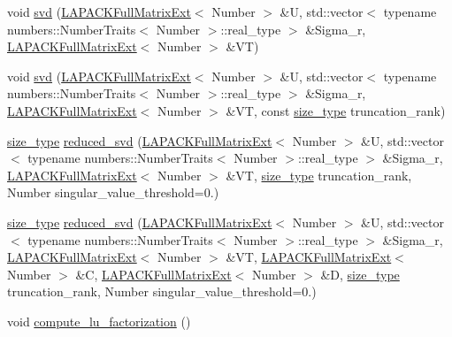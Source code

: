 \begin{DoxyCompactItemize}
\item 
void \hyperlink{classLAPACKFullMatrixExt_a5be14a4d7f9c615f940e870b85d09ecd}{svd} (\hyperlink{classLAPACKFullMatrixExt}{L\+A\+P\+A\+C\+K\+Full\+Matrix\+Ext}$<$ Number $>$ \&U, std\+::vector$<$ typename numbers\+::\+Number\+Traits$<$ Number $>$\+::real\+\_\+type $>$ \&Sigma\+\_\+r, \hyperlink{classLAPACKFullMatrixExt}{L\+A\+P\+A\+C\+K\+Full\+Matrix\+Ext}$<$ Number $>$ \&VT)
\item 
void \hyperlink{classLAPACKFullMatrixExt_a5e51e358cbef31895021abfff0940edd}{svd} (\hyperlink{classLAPACKFullMatrixExt}{L\+A\+P\+A\+C\+K\+Full\+Matrix\+Ext}$<$ Number $>$ \&U, std\+::vector$<$ typename numbers\+::\+Number\+Traits$<$ Number $>$\+::real\+\_\+type $>$ \&Sigma\+\_\+r, \hyperlink{classLAPACKFullMatrixExt}{L\+A\+P\+A\+C\+K\+Full\+Matrix\+Ext}$<$ Number $>$ \&VT, const \hyperlink{classLAPACKFullMatrixExt_a5cf5f4a6104dc17029210b5ca52bf574}{size\+\_\+type} truncation\+\_\+rank)
\item 
\hyperlink{classLAPACKFullMatrixExt_a5cf5f4a6104dc17029210b5ca52bf574}{size\+\_\+type} \hyperlink{classLAPACKFullMatrixExt_a0a6e1d0e88bc84b372b1d0a0f4b79f86}{reduced\+\_\+svd} (\hyperlink{classLAPACKFullMatrixExt}{L\+A\+P\+A\+C\+K\+Full\+Matrix\+Ext}$<$ Number $>$ \&U, std\+::vector$<$ typename numbers\+::\+Number\+Traits$<$ Number $>$\+::real\+\_\+type $>$ \&Sigma\+\_\+r, \hyperlink{classLAPACKFullMatrixExt}{L\+A\+P\+A\+C\+K\+Full\+Matrix\+Ext}$<$ Number $>$ \&VT, \hyperlink{classLAPACKFullMatrixExt_a5cf5f4a6104dc17029210b5ca52bf574}{size\+\_\+type} truncation\+\_\+rank, Number singular\+\_\+value\+\_\+threshold=0.)
\item 
\hyperlink{classLAPACKFullMatrixExt_a5cf5f4a6104dc17029210b5ca52bf574}{size\+\_\+type} \hyperlink{classLAPACKFullMatrixExt_aeafd1f1aca169f4b9164f0a5e521e8cb}{reduced\+\_\+svd} (\hyperlink{classLAPACKFullMatrixExt}{L\+A\+P\+A\+C\+K\+Full\+Matrix\+Ext}$<$ Number $>$ \&U, std\+::vector$<$ typename numbers\+::\+Number\+Traits$<$ Number $>$\+::real\+\_\+type $>$ \&Sigma\+\_\+r, \hyperlink{classLAPACKFullMatrixExt}{L\+A\+P\+A\+C\+K\+Full\+Matrix\+Ext}$<$ Number $>$ \&VT, \hyperlink{classLAPACKFullMatrixExt}{L\+A\+P\+A\+C\+K\+Full\+Matrix\+Ext}$<$ Number $>$ \&C, \hyperlink{classLAPACKFullMatrixExt}{L\+A\+P\+A\+C\+K\+Full\+Matrix\+Ext}$<$ Number $>$ \&D, \hyperlink{classLAPACKFullMatrixExt_a5cf5f4a6104dc17029210b5ca52bf574}{size\+\_\+type} truncation\+\_\+rank, Number singular\+\_\+value\+\_\+threshold=0.)
\item 
void \hyperlink{classLAPACKFullMatrixExt_a110a711628c9d66adb2161779f2ecf63}{compute\+\_\+lu\+\_\+factorization} ()

\end{DoxyCompactItemize}
